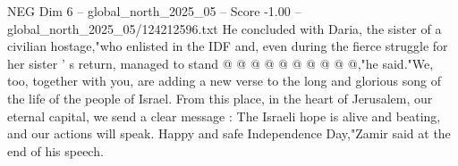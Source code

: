 \begin{textsample}{NEG Dim 6 – global\_north\_2025\_05 – Score -1.00 – global\_north\_2025\_05/124212596.txt}
He concluded with Daria, the sister of a civilian hostage,"who enlisted in the IDF and, even during the fierce struggle for her sister ' s return, managed to stand @ @ @ @ @ @ @ @ @ @,"he said."We, too, together with you, are adding a new verse to the long and glorious song of the life of the people of Israel.
From this place, in the heart of Jerusalem, our eternal capital, we send a clear message : The Israeli hope is alive and beating, and our actions will speak.
Happy and safe Independence Day,"Zamir said at the end of his speech.

\end{textsample}
